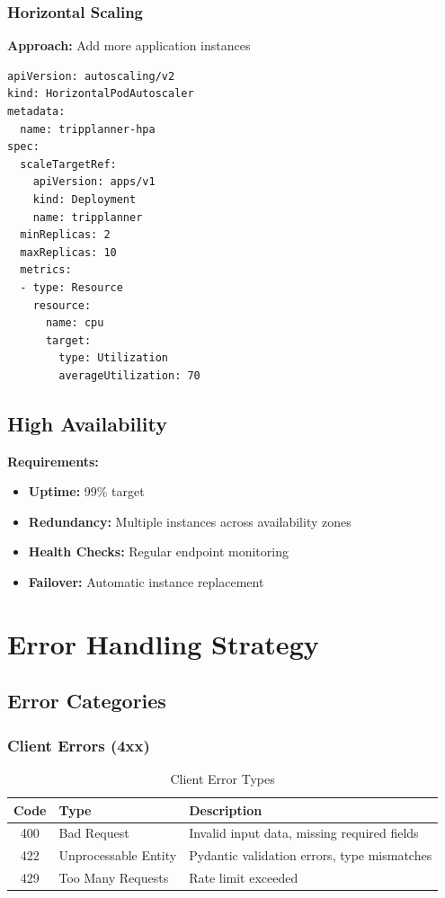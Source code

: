 \documentclass[12pt,a4paper]{report}
\begin{document}
\subsection{Horizontal Scaling}

\textbf{Approach:} Add more application instances

\begin{lstlisting}[style=bashStyle, caption={Kubernetes HPA Configuration}]
apiVersion: autoscaling/v2
kind: HorizontalPodAutoscaler
metadata:
  name: tripplanner-hpa
spec:
  scaleTargetRef:
    apiVersion: apps/v1
    kind: Deployment
    name: tripplanner
  minReplicas: 2
  maxReplicas: 10
  metrics:
  - type: Resource
    resource:
      name: cpu
      target:
        type: Utilization
        averageUtilization: 70
\end{lstlisting}

\section{High Availability}

\textbf{Requirements:}
\begin{itemize}
    \item \textbf{Uptime:} 99\% target
    \item \textbf{Redundancy:} Multiple instances across availability zones
    \item \textbf{Health Checks:} Regular endpoint monitoring
    \item \textbf{Failover:} Automatic instance replacement
\end{itemize}

\chapter{Error Handling Strategy}

\section{Error Categories}

\subsection{Client Errors (4xx)}

\begin{table}[H]
\centering
\begin{tabular}{|c|l|p{7cm}|}
\hline
\textbf{Code} & \textbf{Type} & \textbf{Description} \\
\hline
400 & Bad Request & Invalid input data, missing required fields \\
\hline
422 & Unprocessable Entity & Pydantic validation errors, type mismatches \\
\hline
429 & Too Many Requests & Rate limit exceeded \\
\hline
\end{tabular}
\caption{Client Error Types}
\label{tab:client-errors}
\end{table}
\end{document}
